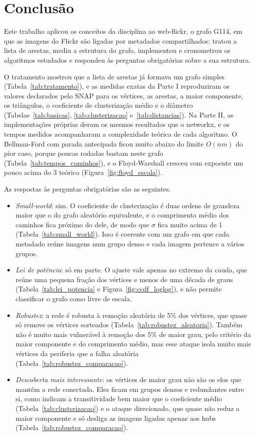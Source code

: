 \section{Conclusão}
\label{sec:conclusao}

Este trabalho aplicou os conceitos da disciplina ao web-flickr, o grafo G114, em que as imagens do Flickr são ligadas por metadados compartilhados: tratou a lista de arestas, mediu a estrutura do grafo, implementou e cronometrou os algoritmos estudados e respondeu às perguntas obrigatórias sobre a sua estrutura.

O tratamento mostrou que a lista de arestas já formava um grafo simples (Tabela~\ref{tab:tratamento}), e as medidas exatas da Parte I reproduziram os valores declarados pelo SNAP para os vértices, as arestas, a maior componente, os triângulos, o coeficiente de clusterização médio e o diâmetro (Tabelas~\ref{tab:basicas}, \ref{tab:clusterizacao} e~\ref{tab:distancias}). Na Parte II, as implementações próprias deram os mesmos resultados que o networkx, e os tempos medidos acompanharam a complexidade teórica de cada algoritmo. O Bellman-Ford com parada antecipada ficou muito abaixo do limite $O(nm)$ do pior caso, porque poucas rodadas bastam neste grafo (Tabela~\ref{tab:tempos_caminhos}), e o Floyd-Warshall cresceu com expoente um pouco acima do 3 teórico (Figura~\ref{fig:floyd_escala}).

As respostas às perguntas obrigatórias são as seguintes.
\begin{itemize}
  \item \emph{Small-world}: sim. O coeficiente de clusterização é duas ordens de grandeza maior que o do grafo aleatório equivalente, e o comprimento médio dos caminhos fica próximo do dele, de modo que $\sigma$ fica muito acima de 1 (Tabela~\ref{tab:small_world}). Isso é coerente com um grafo em que cada metadado reúne imagens num grupo denso e cada imagem pertence a vários grupos.
  \item \emph{Lei de potência}: só em parte. O ajuste vale apenas no extremo da cauda, que reúne uma pequena fração dos vértices e menos de uma década de graus (Tabela~\ref{tab:lei_potencia} e Figura~\ref{fig:ccdf_loglog}), e não permite classificar o grafo como livre de escala.
  \item \emph{Robustez}: a rede é robusta à remoção aleatória de 5\% dos vértices, que quase só remove os vértices sorteados (Tabela~\ref{tab:robustez_aleatoria}). Também não é muito mais vulnerável à remoção dos 5\% de maior grau, pelo critério da maior componente e do comprimento médio, mas esse ataque isola muito mais vértices da periferia que a falha aleatória (Tabela~\ref{tab:robustez_comparacao}).
  \item \emph{Descoberta mais interessante}: os vértices de maior grau não são os elos que mantêm a rede conectada. Eles ficam em grupos densos e redundantes entre si, como indicam a transitividade bem maior que o coeficiente médio (Tabela~\ref{tab:clusterizacao}) e o ataque direcionado, que quase não reduz a maior componente e só desliga as imagens ligadas apenas aos hubs (Tabela~\ref{tab:robustez_comparacao}).
\end{itemize}


